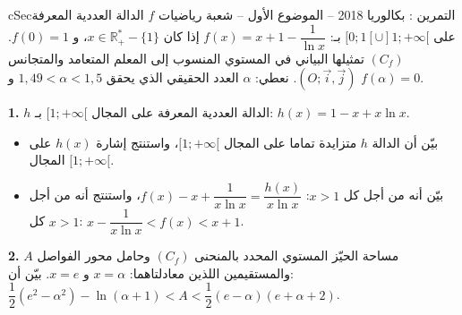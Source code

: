 \documentclass[12pt,a4paper]{article}
\newenvironment{BOX}[2]{\begin{otherlanguage}{english}\begin{arbox}{#1}{#2}}{\end{arbox}\end{otherlanguage}}
\newcounter{exo}
\newenvironment{tamrin}[1]{\stepcounter{exo}\begin{BOX}{cSec}{التمرين \theexo: #1}}{\end{BOX}}
\newcommand{\R}{\mathbb{R}}
\newenvironment{sq}{\begin{itemize}[leftmargin=2.4em,itemsep=3pt]}{\end{itemize}}
\newcommand{\qa}{\item[(أ)]}\newcommand{\qb}{\item[(ب)]}\newcommand{\qc}{\item[(جـ)]}\newcommand{\qd}{\item[(د)]}\newcommand{\qe}{\item[(هـ)]}
\newcommand{\QQ}[1]{\par\smallskip\textbf{#1.} }
\begin{document}
\begin{tamrin}{بكالوريا 2018 -- الموضوع الأول -- شعبة رياضيات}
$f$ الدالة العددية المعرفة على $[0;1[\cup]1;+\infty[$ بـ: $f(x)=x+1-\dfrac{1}{\ln x}$ إذا كان $x\in\R_+^*-\{1\}$، و $f(0)=1$.
$(C_f)$ تمثيلها البياني في المستوي المنسوب إلى المعلم المتعامد والمتجانس $(O;\vec i,\vec j)$.
نعطي: $\alpha$ العدد الحقيقي الذي يحقق $1{,}49<\alpha<1{,}5$ و $f(\alpha)=0$.
\QQ{1} $h$ الدالة العددية المعرفة على المجال $[1;+\infty[$ بـ: $h(x)=1-x+x\ln x$.
\begin{sq}
\qa بيّن أن الدالة $h$ متزايدة تماما على المجال $[1;+\infty[$، واستنتج إشارة $h(x)$ على المجال $[1;+\infty[$.
\qb بيّن أنه من أجل كل $x>1$: $f(x)-x+\dfrac{1}{x\ln x}=\dfrac{h(x)}{x\ln x}$، واستنتج أنه من أجل كل $x>1$: $x-\dfrac{1}{x\ln x}<f(x)<x+1$.
\end{sq}
\QQ{2} $A$ مساحة الحيّز المستوي المحدد بالمنحنى $(C_f)$ وحامل محور الفواصل والمستقيمين اللذين معادلتاهما: $x=\alpha$ و $x=e$.
بيّن أن: $\dfrac12(e^2-\alpha^2)-\ln(\alpha+1)<A<\dfrac12(e-\alpha)(e+\alpha+2)$.
\end{tamrin}
\end{document}

